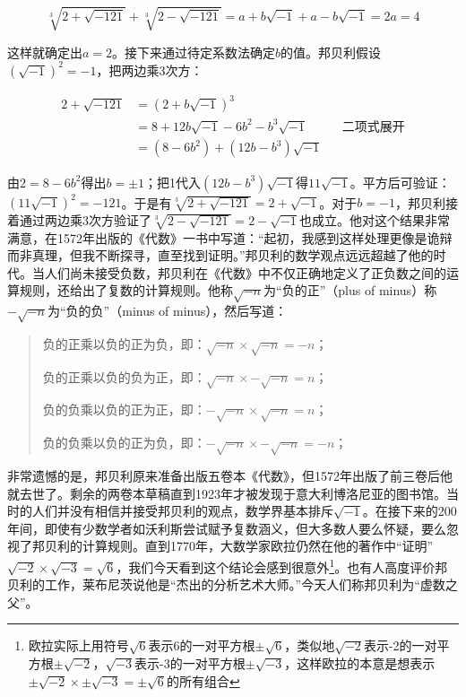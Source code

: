 \documentclass[b5paper]{ctexart}
\begin{document}
\[
\sqrt[3]{2 + \sqrt{-121}} + \sqrt[3]{2 - \sqrt{-121}} = a + b\sqrt{-1} + a - b\sqrt{-1} = 2a = 4
\]

这样就确定出$a = 2$。接下来通过待定系数法确定$b$的值。邦贝利假设$(\sqrt{-1})^2 = -1$，把两边乘3次方：

\begin{align*}
2 + \sqrt{-121} &= (2 + b\sqrt{-1})^3 \\
  &= 8 + 12b\sqrt{-1} - 6b^2 - b^3\sqrt{-1} && \text{二项式展开} \\
  &= (8 - 6b^2) + (12b - b^3)\sqrt{-1}
\end{align*}

由$2 = 8 - 6b^2$得出$b = \pm 1$；把1代入$(12b - b^3)\sqrt{-1}$得$11\sqrt{-1}$。平方后可验证：$(11\sqrt{-1})^2 = -121$。于是有$\sqrt[3]{2 + \sqrt{-121}} = 2 + \sqrt{-1}$。对于$b = -1$，邦贝利接着通过两边乘3次方验证了$\sqrt[3]{2 - \sqrt{-121}} = 2 - \sqrt{-1}$也成立。他对这个结果非常满意，在1572年出版的《代数》一书中写道：“起初，我感到这样处理更像是诡辩而非真理，但我不断探寻，直至找到证明。”\cite{OMerino-2006}邦贝利的数学观点远远超越了他的时代。当人们尚未接受负数，邦贝利在《代数》中不仅正确地定义了正负数之间的运算规则，还给出了复数的计算规则。他称$\sqrt{-n}$为“负的正”（plus of minus）称$-\sqrt{-n}$为“负的负”（minus of minus），然后写道\cite{MacTour-Bombelli}：

\begin{quotation}
负的正乘以负的正为负，即：$\sqrt{-n} \times \sqrt{-n} = -n$；

负的正乘以负的负为正，即：$\sqrt{-n} \times -\sqrt{-n} = n$；

负的负乘以负的正为正，即：$-\sqrt{-n} \times \sqrt{-n} = n$；

负的负乘以负的正为负，即：$-\sqrt{-n} \times -\sqrt{-n} = -n$；
\end{quotation}

非常遗憾的是，邦贝利原来准备出版五卷本《代数》，但1572年出版了前三卷后他就去世了。剩余的两卷本草稿直到1923年才被发现于意大利博洛尼亚的图书馆。当时的人们并没有相信并接受邦贝利的观点，数学界基本排斥$\sqrt{-1}$。在接下来的200年间，即使有少数学者如沃利斯尝试赋予复数涵义，但大多数人要么怀疑，要么忽视了邦贝利的计算规则。直到1770年，大数学家欧拉仍然在他的著作中“证明”$\sqrt{-2} \times \sqrt{-3} = \sqrt{6}$，我们今天看到这个结论会感到很意外\footnote{欧拉实际上用符号$\sqrt{6}$表示6的一对平方根$\pm\sqrt{6}$，类似地$\sqrt{-2}$表示-2的一对平方根$\pm\sqrt{-2}$，$\sqrt{-3}$表示-3的一对平方根$\pm\sqrt{-3}$，这样欧拉的本意是想表示$\pm \sqrt{-2} \times \pm \sqrt{-3} = \pm \sqrt{6}$的所有组合}。也有人高度评价邦贝利的工作，莱布尼茨说他是“杰出的分析艺术大师。”今天人们称邦贝利为“虚数之父”。
\end{document}
